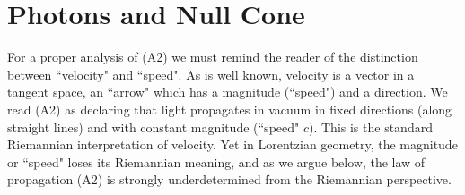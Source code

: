 \documentclass[12pt]{article}
\begin{document}







\section{Photons and Null Cone}\label{s3}


For a proper analysis of (A2) we must remind the reader of the distinction between ``velocity" and ``speed".  As is well known, velocity is a vector in a tangent space, an ``arrow" which has a magnitude (``speed") and a direction. We read (A2) as declaring that light propagates in vacuum in fixed directions (along straight lines) and with constant magnitude (``speed" $c$). This is the standard Riemannian interpretation of velocity. Yet in Lorentzian geometry, the magnitude or ``speed" loses its Riemannian meaning, and as we argue below, the law of propagation (A2) is strongly underdetermined from the Riemannian perspective. 





\end{document}
